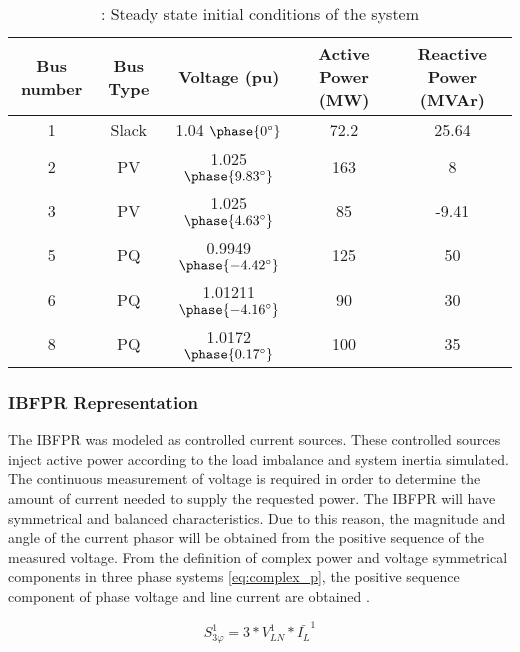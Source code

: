 \begin{table}[h]
	\caption{\label{tb:initial}: Steady state initial conditions of the system}
	\centering
	\begin{tabular}{ccccc}
		\toprule
		\textbf{Bus number}	& \textbf{Bus Type}	& \textbf{Voltage (pu)}& \textbf{Active Power (MW)}& \textbf{Reactive Power (MVAr)}\\
		\midrule
		1		& Slack			& 1.04 $\phase{0^{\circ}} $     &    72.2    & 25.64    \\
		2		& PV			& 1.025 $\phase{9.83^{\circ}} $      & 163      & 8     \\
		3		& PV			& 1.025 $\phase{4.63^{\circ}} $     & 85       &    -9.41 \\
		5		& PQ			& 0.9949 $\phase{-4.42^{\circ}} $       &125       &  50    \\
		6		& PQ			& 1.01211 $\phase{-4.16^{\circ}} $      &   90     &  30   \\
		8		& PQ			& 1.0172 $ \phase{0.17^{\circ}} $       &  100     &   35   \\
		
		\bottomrule
	\end{tabular}
\end{table}


\subsubsection{IBFPR Representation}


The IBFPR was modeled as controlled current sources. These controlled sources inject active power according to the load imbalance and system inertia simulated. The continuous measurement of voltage is required in order to determine the amount of current needed to supply the requested power. The IBFPR will have symmetrical and balanced characteristics. Due to this reason, the magnitude and angle of the current phasor will be obtained from the positive sequence of the measured voltage. From the definition of complex power and voltage symmetrical components in three phase systems \eqref{eq:complex_p}, the positive sequence component of phase voltage and line current are obtained \cite{john1994power}. 

\begin{equation}
\label{eq:complex_p}
S_{3\varphi}^1=3*V_{LN}^1*\bar{I_{L}}^1
\end{equation}

